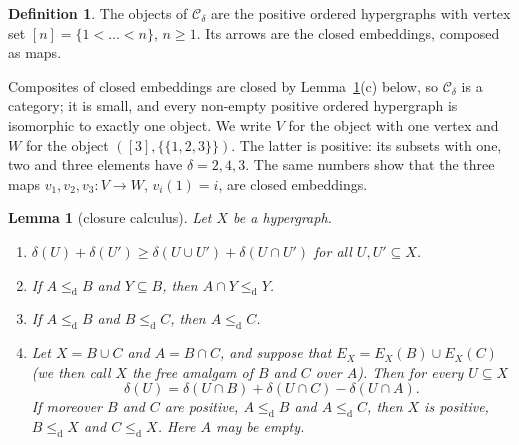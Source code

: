 \documentclass[11pt,a4paper]{article}
\newtheorem{lemma}[theorem]{Lemma}
\theoremstyle{definition}
\newtheorem{definition}[theorem]{Definition}
\newcommand{\Cd}{\mathcal{C}_{\delta}}
\newcommand{\cle}{\leq_{\mathrm{d}}}
\begin{document}
\begin{definition}\label{def:cdelta}
The objects of $\Cd$ are the positive ordered hypergraphs with vertex set
$[n]=\{1<\dots<n\}$, $n\ge 1$. Its arrows are the closed embeddings, composed as
maps.
\end{definition}

Composites of closed embeddings are closed by Lemma~\ref{lem:calc}(c) below, so
$\Cd$ is a category; it is small, and every non-empty positive ordered
hypergraph is isomorphic to exactly one object. We write $V$ for the object
with one vertex and $W$ for the object $([3],\{\{1,2,3\}\})$. The latter is
positive: its subsets with one, two and three elements have
$\delta=2,4,3$. The same numbers show that the three maps
$v_1,v_2,v_3\colon V\to W$, $v_i(1)=i$, are closed embeddings.

\begin{lemma}[closure calculus]\label{lem:calc}
Let $X$ be a hypergraph.
\begin{enumerate}
\item[\textup{(a)}] $\delta(U)+\delta(U')\ge\delta(U\cup U')+\delta(U\cap U')$ for all
 $U,U'\subseteq X$.
\item[\textup{(b)}] If $A\cle B$ and $Y\subseteq B$, then $A\cap Y\cle Y$.
\item[\textup{(c)}] If $A\cle B$ and $B\cle C$, then $A\cle C$.
\item[\textup{(d)}] Let $X=B\cup C$ and $A=B\cap C$, and suppose that
 $E_X=E_X(B)\cup E_X(C)$ \textup{(}we then call $X$ the \emph{free amalgam} of $B$
 and $C$ over $A$\textup{)}. Then for every $U\subseteq X$
 \begin{equation}\label{eq:amalgam}
  \delta(U)=\delta(U\cap B)+\delta(U\cap C)-\delta(U\cap A).
 \end{equation}
 If moreover $B$ and $C$ are positive, $A\cle B$ and $A\cle C$, then $X$ is
 positive, $B\cle X$ and $C\cle X$. Here $A$ may be empty.
\end{enumerate}
\end{lemma}
\end{document}
